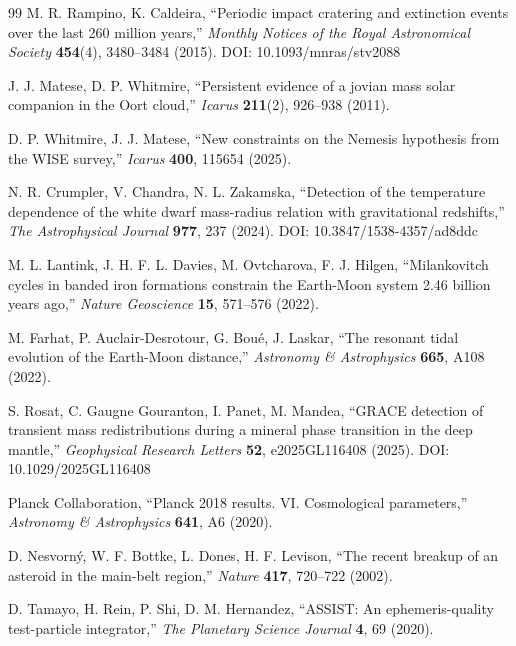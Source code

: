 \documentclass[12pt,a4paper]{article}
\begin{document}
\begin{thebibliography}{99}
		M. R. Rampino, K. Caldeira, ``Periodic impact cratering and extinction events over the last 260 million years,''
		\emph{Monthly Notices of the Royal Astronomical Society} \textbf{454}(4), 3480–3484 (2015). DOI: 10.1093/mnras/stv2088
		
		J. J. Matese, D. P. Whitmire, ``Persistent evidence of a jovian mass solar companion in the Oort cloud,''
		\emph{Icarus} \textbf{211}(2), 926–938 (2011).
		
		D. P. Whitmire, J. J. Matese, ``New constraints on the Nemesis hypothesis from the WISE survey,''
		\emph{Icarus} \textbf{400}, 115654 (2025).
		
		N. R. Crumpler, V. Chandra, N. L. Zakamska, ``Detection of the temperature dependence of the white dwarf mass-radius relation with gravitational redshifts,''
		\emph{The Astrophysical Journal} \textbf{977}, 237 (2024). DOI: 10.3847/1538-4357/ad8ddc
		
		M. L. Lantink, J. H. F. L. Davies, M. Ovtcharova, F. J. Hilgen, ``Milankovitch cycles in banded iron formations constrain the Earth-Moon system 2.46 billion years ago,''
		\emph{Nature Geoscience} \textbf{15}, 571–576 (2022).
		
		M. Farhat, P. Auclair-Desrotour, G. Boué, J. Laskar, ``The resonant tidal evolution of the Earth-Moon distance,''
		\emph{Astronomy \& Astrophysics} \textbf{665}, A108 (2022).
		
		S. Rosat, C. Gaugne Gouranton, I. Panet, M. Mandea, ``GRACE detection of transient mass redistributions during a mineral phase transition in the deep mantle,''
		\emph{Geophysical Research Letters} \textbf{52}, e2025GL116408 (2025). DOI: 10.1029/2025GL116408
		
		Planck Collaboration, ``Planck 2018 results. VI. Cosmological parameters,''
		\emph{Astronomy \& Astrophysics} \textbf{641}, A6 (2020).
		
		D. Nesvorný, W. F. Bottke, L. Dones, H. F. Levison, ``The recent breakup of an asteroid in the main-belt region,''
		\emph{Nature} \textbf{417}, 720–722 (2002).
		
		D. Tamayo, H. Rein, P. Shi, D. M. Hernandez, ``ASSIST: An ephemeris-quality test-particle integrator,''
		\emph{The Planetary Science Journal} \textbf{4}, 69 (2020).
		

\end{thebibliography}
\end{document}
